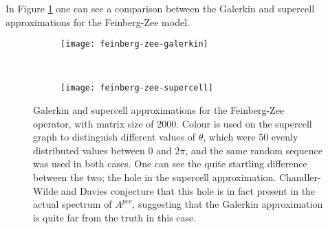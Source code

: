 \documentclass[../main.tex]{subfiles}
\begin{document}
In Figure \ref{fig:feinberg-zee} one can see a comparison between the Galerkin
and supercell approximations for the Feinberg-Zee model. 

\begin{figure}[h!]
\centering
\begin{subfigure}{0.9\textwidth}
  \texttt{[image: feinberg-zee-galerkin]}
  \end{subfigure}\\
  \begin{subfigure}{0.9\textwidth}
  \texttt{[image: feinberg-zee-supercell]} \end{subfigure}
  \caption{Galerkin and supercell approximations for the Feinberg-Zee operator,
	with matrix size of 2000. Colour is used on the supercell graph to
	distinguish different values of $\theta$, which were 50 evenly
	distributed values between $0$ and $2 \pi$, and the same random
	sequence was used in both cases. One can see the quite startling
	difference between the two; the hole in the supercell approximation.
	Chandler-Wilde and Davies \cite{chandler-wilde2012spectrum} conjecture
	that this hole is in fact present in the actual spectrum of $A^{per}$,
        suggesting that the Galerkin approximation is quite far from the truth
        in this case.}
\label{fig:feinberg-zee}
\end{figure}
\clearpage
\end{document}
